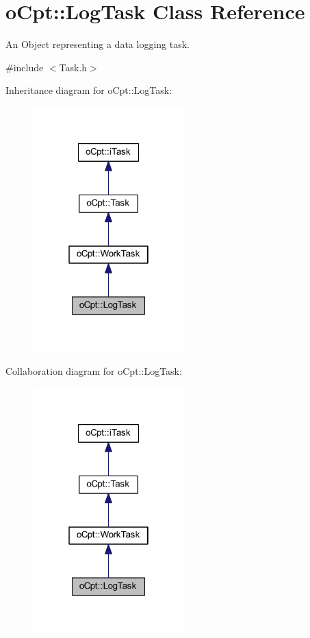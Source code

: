 \hypertarget{classo_cpt_1_1_log_task}{}\section{o\+Cpt\+:\+:Log\+Task Class Reference}
\label{classo_cpt_1_1_log_task}


An Object representing a data logging task.  




{\ttfamily \#include $<$Task.\+h$>$}



Inheritance diagram for o\+Cpt\+:\+:Log\+Task\+:\nopagebreak
\begin{figure}[H]
\begin{center}
\leavevmode
\includegraphics[width=166pt]{classo_cpt_1_1_log_task__inherit__graph}
\end{center}
\end{figure}


Collaboration diagram for o\+Cpt\+:\+:Log\+Task\+:\nopagebreak
\begin{figure}[H]
\begin{center}
\leavevmode
\includegraphics[width=166pt]{classo_cpt_1_1_log_task__coll__graph}
\end{center}
\end{figure}
